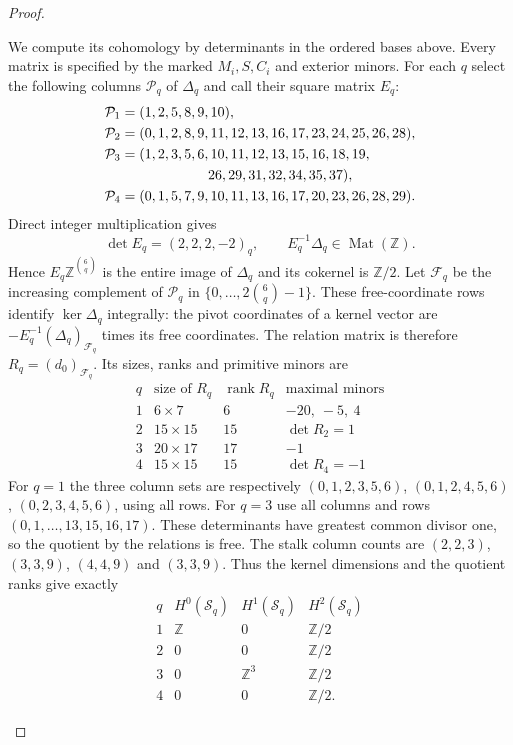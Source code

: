 \documentclass[11pt,a4paper]{article}
\numberwithin{equation}{section}
\theoremstyle{definition}
\begin{document}
\begin{proof}
\begin{enumerate}[label=\arabic*.,leftmargin=*]
We compute its cohomology by determinants in the ordered bases above.
Every matrix is specified by the marked $M_i,S,C_i$ and exterior minors.
For each $q$ select the following columns $\mathcal P_q$ of
$\Delta_q$ and call their square matrix $E_q$:
\[
\begin{aligned}
\mathcal P_1&=(1,2,5,8,9,10),\\
\mathcal P_2&=(0,1,2,8,9,11,12,13,16,17,23,24,25,26,28),\\
\mathcal P_3&=(1,2,3,5,6,10,11,12,13,15,16,18,19,\\
             &\hspace{22mm}26,29,31,32,34,35,37),\\
\mathcal P_4&=(0,1,5,7,9,10,11,13,16,17,20,23,26,28,29).
\end{aligned}
\]
Direct integer multiplication gives
\[
 \det E_q=(2,2,2,-2)_q,\qquad
 E_q^{-1}\Delta_q\in\operatorname{Mat}(\mathbb Z).
\]
Hence $E_q\mathbb Z^{\binom6q}$ is the entire image of
$\Delta_q$ and its cokernel is $\mathbb Z/2$.
Let $\mathcal F_q$ be the increasing complement of $\mathcal P_q$
in $\{0,\ldots,2\binom6q-1\}$.
These free-coordinate rows identify $\ker\Delta_q$ integrally:
the pivot coordinates of a kernel vector are
$-E_q^{-1}(\Delta_q)_{\mathcal F_q}$ times its free coordinates.
The relation matrix is therefore $R_q=(d_0)_{\mathcal F_q}$.
Its sizes, ranks and primitive minors are
\[
\begin{array}{c|c|c|l}
q&\text{size of }R_q&\operatorname{rank}R_q&
\text{maximal minors}\\ \hline
1&6\times7&6&-20,\ -5,\ 4\\
2&15\times15&15&\det R_2=1\\
3&20\times17&17&-1\\
4&15\times15&15&\det R_4=-1
\end{array}
\]
For $q=1$ the three column sets are respectively
$(0,1,2,3,5,6)$, $(0,1,2,4,5,6)$, $(0,2,3,4,5,6)$,
using all rows.  For $q=3$ use all columns and rows
$(0,1,\ldots,13,15,16,17)$.
These determinants have greatest common divisor one, so the
quotient by the relations is free.  The stalk column counts are
$(2,2,3)$, $(3,3,9)$, $(4,4,9)$ and $(3,3,9)$.
Thus the kernel dimensions and the quotient ranks give exactly
\[
\begin{array}{c|ccc}
q&H^0(\mathcal S_q)&H^1(\mathcal S_q)&H^2(\mathcal S_q)\\ \hline
1&\mathbb Z&0&\mathbb Z/2\\
2&0&0&\mathbb Z/2\\
3&0&\mathbb Z^3&\mathbb Z/2\\
4&0&0&\mathbb Z/2.
\end{array}
\]


\end{enumerate}
\end{proof}
\end{document}

